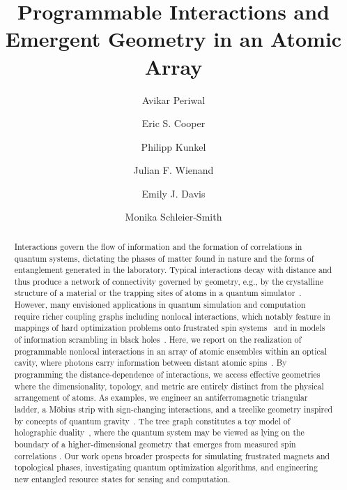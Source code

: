 \documentclass[aps,pra,superscriptaddress,12pt]{revtex4-1} %
\begin{document}
\begin{bibunit}
\renewcommand{\figurename}{\textbf{Fig.}}
\title{Programmable Interactions and Emergent Geometry in an Atomic Array}

\author{Avikar Periwal}
\author{Eric S. Cooper}
\author{Philipp Kunkel}
\author{Julian F. Wienand}
\author{Emily J. Davis}
\author{Monika Schleier-Smith}

\begin{abstract}
Interactions govern the flow of information and the formation of correlations in quantum systems, dictating the phases of matter found in nature and the forms of entanglement generated in the laboratory. Typical interactions decay with distance and thus produce a network of connectivity governed by geometry, e.g., by the crystalline structure of a material or the trapping sites of atoms in a quantum simulator~\cite{bloch2012quantum,browaeys2020many}.  However, many envisioned applications in quantum simulation and computation require richer coupling graphs including nonlocal interactions, which notably feature in mappings of hard optimization problems onto frustrated spin systems~\cite{Das2008,gopalakrishnan2011frustration,strack2011dicke,mcmahon2016fully,berloff2017realizing} and in models of information scrambling in black holes~\cite{hayden2007black,maldacena2016remarks,bentsen2019treelike,belyansky2020minimal}. Here, we report on the realization of programmable nonlocal interactions in an array of atomic ensembles within an optical cavity, where photons carry information between distant atomic spins~\cite{leroux2010implementation,barontini2015deterministic,hosten2016measurement,welte2018photon,pedrozo2020entanglement,davis2019photon,davis2020protecting,muniz2020exploring}.  By programming the distance-dependence of interactions, we access effective geometries where the dimensionality, topology, and metric are entirely distinct from the physical arrangement of atoms.  As examples, we engineer an antiferromagnetic triangular ladder, a M\"{o}bius strip with sign-changing interactions, and a treelike geometry inspired by concepts of quantum gravity~\cite{barbon2013fast,gubser2017p,heydeman2016tensor,bentsen2019treelike}. The tree graph constitutes a toy model of holographic duality~\cite{gubser2017p,heydeman2016tensor}, where the quantum system may be viewed as lying on the boundary of a higher-dimensional geometry that emerges from measured spin correlations \cite{qi2018does}.  Our work opens broader prospects for simulating frustrated magnets and topological phases, investigating quantum optimization algorithms, and engineering new entangled resource states for sensing and computation.



\end{abstract}
\end{bibunit}
\end{document}

